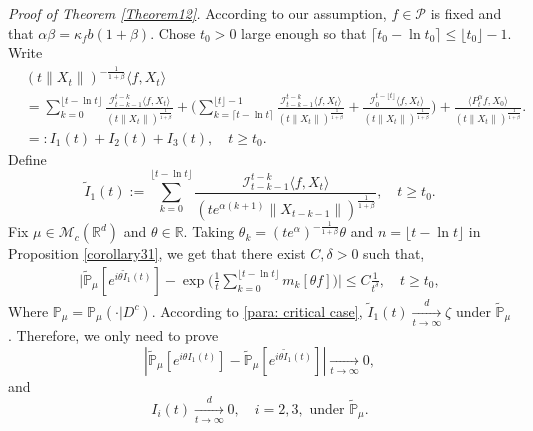 \documentclass[12pt,a4paper]{amsart}
\theoremstyle{plain}
\theoremstyle{definition}
\numberwithin{equation}{section}
\begin{document}
{\it Proof of Theorem \ref{Theorem12}.}\quad
  According to our assumption, $f\in\mathcal{P}$ is fixed and that  $\alpha\beta=\kappa_fb(1+\beta)$.
    Chose $t_0 > 0$ large enough so that $\lceil t_0-\ln t_0\rceil \leq \lfloor t_0 \rfloor - 1.$
    Write
    \begin{align*}
        &(t\|X_t\|)^{-\frac{1}{1+\beta}}\langle f,X_t\rangle
        \\ &=\sum_{k=0}^{\lfloor t-\ln t \rfloor} \frac{\mathcal I_{t-k-1}^{t-k}\langle f ,X_t\rangle}{(t\|X_t\|)^{\frac{1}{1+\beta}}}+\Big(\sum_{k=\lceil t-\ln t \rceil}^{\lfloor t \rfloor-1} \frac{\mathcal I_{t-k-1}^{t-k}\langle f ,X_t\rangle}{(t\|X_t\|)^{\frac{1}{1+\beta}}}+\frac{\mathcal I_0^{t-\lfloor t \rfloor}\langle f ,X_t\rangle}{(t\|X_t\|)^{\frac{1}{1+\beta}}}\Big) +
         \frac{\langle P^\alpha_tf,X_0\rangle}{(t\|X_t\|)^{\frac{1}{1+\beta}}}.
        \\&=:I_1(t)+I_2(t) + I_3(t),
        \quad t\geq t_0.
    \end{align*}
    Define
\[
    \tilde I_1(t)
    :=\sum_{k=0}^{\lfloor t-\ln t \rfloor}\frac{\mathcal I_{t-k-1}^{t-k}\langle f ,X_t\rangle}{(t e^{\alpha(k+1)}\|X_{t-k-1}\|)^{\frac{1}{1+\beta}}},
    \quad t\geq t_0.
\]
    Fix $\mu \in \mathcal M_c(\mathbb R^d)$ and $\theta\in \mathbb R$. Taking $\theta_k=(t e^{\alpha})^{-\frac{1}{1+\beta}} \theta $ and $n={\lfloor t-\ln t \rfloor}$
    in Proposition \ref{corollary31},
    we get that there exist $C,\delta>0$ such that,
\begin{align*}
        \Big|\mathbb{\tilde{P}}_{\mu} [e^{i\theta\tilde{I}_1(t)}]-\exp\Big(\frac{1}{t}\sum_{k=0}^{\lfloor t-\ln t \rfloor}m_k[\theta f]\Big)\Big|\leq C \frac{1}{t^{\delta}},
        \quad t\geq t_0,
\end{align*}
    Where $\mathcal{\mathbb{P}}_{\mu}=\mathbb{P}_{\mu}(\cdot|D^c)$. According to \eqref{para: critical case},  $\tilde{I}_1(t)\xrightarrow[t\to \infty]{d}\zeta$ under $\tilde {\mathbb P}_\mu$.
    Therefore, we only need to prove
 \begin{equation}\label{toprove-1}|\mathbb{\tilde{P}}_{\mu}[e^{i\theta I_1(t)}]-\mathbb{\tilde{P}}_{\mu}[e^{i\theta\tilde{I}_1(t)}]|\xrightarrow[t\to \infty]{} 0,
 \end{equation}
      and
     \begin{equation}\label{toprove-2}
     I_i(t)\xrightarrow[t\to \infty]{d} 0,\quad i = 2,3,  \mbox{ under } \tilde {\mathbb P}_\mu.\end{equation}
\end{document}
